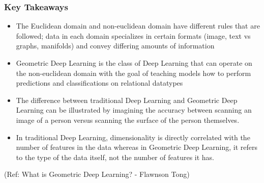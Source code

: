 \begin{frame}[fragile]\frametitle{Key Takeaways
}


\begin{itemize}
\item  The Euclidean domain and non-euclidean domain have different rules that are followed; data in each domain specializes in certain formats (image, text vs graphs, manifolds) and convey differing amounts of information
\item  Geometric Deep Learning is the class of Deep Learning that can operate on the non-euclidean domain with the goal of teaching models how to perform predictions and classifications on relational datatypes
\item  The difference between traditional Deep Learning and Geometric Deep Learning can be illustrated by imagining the accuracy between scanning an image of a person versus scanning the surface of the person themselves.
\item  In traditional Deep Learning, dimensionality is directly correlated with the number of features in the data whereas in Geometric Deep Learning, it refers to the type of the data itself, not the number of features it has.
\end{itemize}
	  
{\tiny (Ref: What is Geometric Deep Learning? - Flawnson Tong)}

\end{frame}
